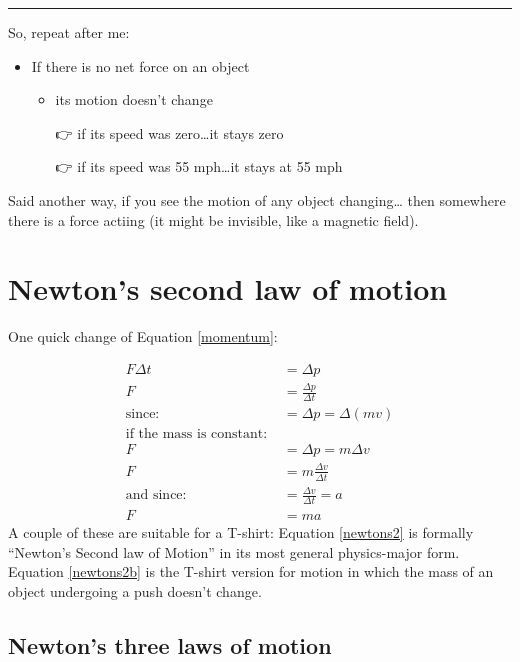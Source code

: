 \documentclass[
  letterpaper,
  DIV=11,
  numbers=noendperiod,
  oneside]{scrreprt}
\begin{document}
\begin{center}\rule{0.5\linewidth}{0.5pt}\end{center}

So, repeat after me:

\begin{itemize}
\item
  If there is no net force on an object

  \begin{itemize}
  \item
    its motion doesn't change

    👉 if its speed was zero\ldots it stays zero

    👉 if its speed was 55 mph\ldots it stays at 55 mph
  \end{itemize}
\end{itemize}

Said another way, if you see the motion of any object changing\ldots{}
then somewhere there is a force actiing (it might be invisible, like a
magnetic field).

\section{Newton's second law of motion}\label{sec-secondlaw}

One quick change of Equation \ref{momentum}:

\[
\begin{align}
F\Delta t &= \Delta p \nonumber \\
F &= \frac{\Delta p}{\Delta t} \label{newtons2} \\
\text{since: }&=\Delta p = \Delta (mv) \nonumber \\
\text{if the mass is constant: } \nonumber \\
F &= \Delta p =m\Delta v \nonumber\\
F &= m \frac{\Delta v}{\Delta t} \nonumber \\
\text{and since: } &= \frac{\Delta v}{\Delta t} = a \nonumber \\
F &= ma \label{newtons2b}
\end{align}
\] A couple of these are suitable for a T-shirt: Equation \ref{newtons2}
is formally ``Newton's Second law of Motion'' in its most general
physics-major form. Equation \ref{newtons2b} is the T-shirt version for
motion in which the mass of an object undergoing a push doesn't change.

\subsection{Newton's three laws of motion}\label{sec-newtonslaws}
\end{document}
